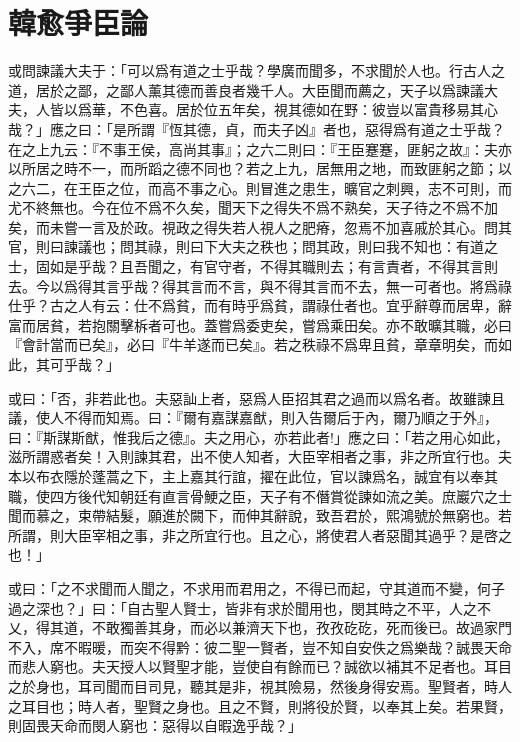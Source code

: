 \section[爭臣論\quad{\small 韓愈}]{{\normalsize 韓愈}\quad 爭臣論}
或問諫議大夫于：「可以爲有道之士乎哉？學廣而聞多，不求聞於人也。行古人之道，居於之鄙，之鄙人薰其德而善良者幾千人。大臣聞而薦之，天子以爲諫議大夫，人皆以爲華，不色喜。居於位五年矣，視其德如在野：彼豈以富貴移易其心哉？」應之曰：「是所謂『恆其德，貞，而夫子凶』者也，惡得爲有道之士乎哉？在之上九云：『不事王侯，高尚其事』；之六二則曰：『王臣蹇蹇，匪躬之故』：夫亦以所居之時不一，而所蹈之德不同也？若之上九，居無用之地，而致匪躬之節；以之六二，在王臣之位，而高不事之心。則冒進之患生，曠官之刺興，志不可則，而尤不終無也。今在位不爲不久矣，聞天下之得失不爲不熟矣，天子待之不爲不加矣，而未嘗一言及於政。視政之得失若人視人之肥瘠，忽焉不加喜戚於其心。問其官，則曰諫議也；問其祿，則曰下大夫之秩也；問其政，則曰我不知也：有道之士，固如是乎哉？且吾聞之，有官守者，不得其職則去；有言責者，不得其言則去。今以爲得其言乎哉？得其言而不言，與不得其言而不去，無一可者也。將爲祿仕乎？古之人有云：仕不爲貧，而有時乎爲貧，謂祿仕者也。宜乎辭尊而居卑，辭富而居貧，若抱關擊柝者可也。蓋嘗爲委吏矣，嘗爲乘田矣。亦不敢曠其職，必曰『會計當而已矣』，必曰『牛羊遂而已矣』。若之秩祿不爲卑且貧，章章明矣，而如此，其可乎哉？」

或曰：「否，非若此也。夫惡訕上者，惡爲人臣招其君之過而以爲名者。故雖諫且議，使人不得而知焉。曰：『爾有嘉謀嘉猷，則入告爾后于內，爾乃順之于外』，曰：『斯謀斯猷，惟我后之德』。夫之用心，亦若此者!」應之曰：「若之用心如此，滋所謂惑者矣！入則諫其君，出不使人知者，大臣宰相者之事，非之所宜行也。夫本以布衣隱於蓬蒿之下，主上嘉其行誼，擢在此位，官以諫爲名，誠宜有以奉其職，使四方後代知朝廷有直言骨鯁之臣，天子有不僭賞從諫如流之美。庶巖穴之士聞而慕之，束帶結髮，願進於闕下，而伸其辭說，致吾君於，熙鴻號於無窮也。若所謂，則大臣宰相之事，非之所宜行也。且之心，將使君人者惡聞其過乎？是啓之也！」

或曰：「之不求聞而人聞之，不求用而君用之，不得已而起，守其道而不變，何子過之深也？」曰：「自古聖人賢士，皆非有求於聞用也，閔其時之不平，人之不乂，得其道，不敢獨善其身，而必以兼濟天下也，孜孜矻矻，死而後已。故過家門不入，席不暇暖，而突不得黔：彼二聖一賢者，豈不知自安佚之爲樂哉？誠畏天命而悲人窮也。夫天授人以賢聖才能，豈使自有餘而已？誠欲以補其不足者也。耳目之於身也，耳司聞而目司見，聽其是非，視其險易，然後身得安焉。聖賢者，時人之耳目也；時人者，聖賢之身也。且之不賢，則將役於賢，以奉其上矣。若果賢，則固畏天命而閔人窮也：惡得以自暇逸乎哉？」

